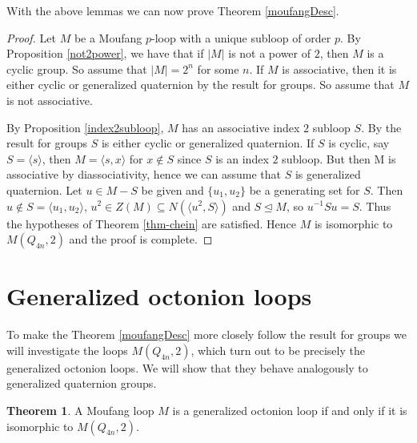 \documentclass[12pt]{report}
\theoremstyle{definition}
\newtheorem{thm}{Theorem}[chapter]
\begin{document}
With the above lemmas we can now prove Theorem \ref{moufangDesc}.

\begin{proof}
	Let $M$ be a Moufang $p$-loop with a unique subloop of order $p$.
    By Proposition \ref{not2power}, we have that if $|M|$ is not a power of $2$, then $M$ is a cyclic group.
    So assume that $|M| = 2^n$ for some $n$. If $M$ is associative, then it is either cyclic or generalized
    quaternion by the result for groups. So assume that $M$ is not associative.

    By Proposition \ref{index2subloop}, $M$ has an associative index $2$ subloop $S$. By the result for
      groups $S$ is either cyclic or generalized quaternion. If $S$ is cyclic, say $S = \langle s\rangle$,
      then $M = \langle s, x\rangle$ for $x\notin S$ since $S$ is an index $2$ subloop. But then M is
      associative by diassociativity, hence we can assume that $S$ is generalized quaternion. Let
      $u\in M- S$ be given and $\{u_1, u_2\}$ be a generating set for $S$. Then
      $u\notin S = \langle u_1, u_2\rangle$, $u^2 \in Z(M) \subseteq N(\langle u^2, S\rangle)$ and $S\unlhd M$,
      so $u^{-1}Su = S$. Thus the hypotheses of Theorem \ref{thm-chein} are satisfied. Hence $M$ is isomorphic
      to $M(Q_{4n}, 2)$ and the proof is complete.
\end{proof}


\section{Generalized octonion loops}

To make the Theorem \ref{moufangDesc} more closely follow the result for groups we will investigate the
  loops $M(Q_{4n}, 2)$, which turn out to be precisely the generalized octonion loops. We will show that
  they behave analogously to generalized quaternion groups.

\begin{thm}\label{doubling}
    A Moufang loop $M$ is a generalized octonion loop if and only if it is isomorphic to $M(Q_{4n}, 2)$.
\end{thm}
\end{document}
